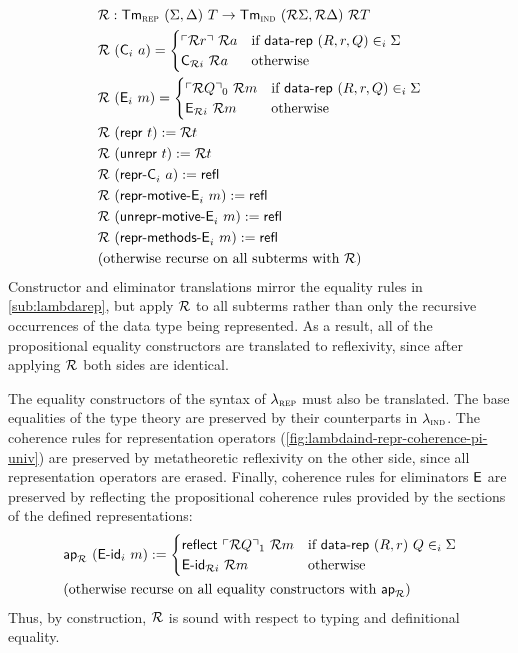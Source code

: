 \begin{align*}
  & \mathcal{R} : \textsf{Tm}_{\textsc{rep}}\ (\Sigma, \Delta)\ T \to \textsf{Tm}_{\textsc{ind}}\ (\mathcal{R} \Sigma, \mathcal{R} \Delta)\ \mathcal{R} T \\
  &\mathcal{R}\ (\textsf{C}_i\ a) = \begin{cases}
      \ulcorner \mathcal{R} r \urcorner\ \mathcal{R} a & \text{if}\ \textsf{data-rep}\ (R, r, Q) \in_i \Sigma \\
      \textsf{C}_{\mathcal{R} i}\ \mathcal{R} a & \text{otherwise}
  \end{cases} \\
  &\mathcal{R}\ (\textsf{E}_i\ m) = \begin{cases}
      \ulcorner \mathcal{R} Q \urcorner_0\ \mathcal{R} m & \text{if}\ \textsf{data-rep}\ (R, r, Q) \in_i \Sigma \\
      \textsf{E}_{\mathcal{R} i}\ \mathcal{R} m & \text{otherwise}
  \end{cases} \\
  & \mathcal{R}\ (\textsf{repr}\ t) := \mathcal{R} t \\
  & \mathcal{R}\ (\textsf{unrepr}\ t) := \mathcal{R} t \\
  & \mathcal{R}\ (\textsf{repr-C}_i\ a) := \textsf{refl} \\
  & \mathcal{R}\ (\textsf{repr-motive-E}_i\ m) := \textsf{refl} \\
  & \mathcal{R}\ (\textsf{unrepr-motive-E}_i\ m) := \textsf{refl} \\
  & \mathcal{R}\ (\textsf{repr-methods-E}_i\ m) := \textsf{refl} \\
  & \text{(otherwise recurse on all subterms with $\mathcal{R}$)}
\end{align*}
Constructor and eliminator translations mirror the equality rules in
\cref{sub:lambdarep}, but apply $\mathcal{R}$ to all subterms rather than only the
recursive occurrences of the data type being represented. As a result, all of
the propositional equality constructors are translated to reflexivity, since
after applying $\mathcal{R}$ both sides are identical.

The equality constructors of the syntax of $\lambda_{\textsc{rep}}$ must also be translated.
The base equalities of the type theory are preserved by their counterparts in $\lambda_{\textsc{ind}}$.
The coherence rules for representation operators
(\cref{fig:lambdaind-repr-coherence-pi-univ}) are preserved by metatheoretic
reflexivity on the other side, since all representation operators are erased.
Finally, coherence rules for eliminators $\textsf{E}$ are preserved by reflecting
the propositional coherence rules provided by the sections of the defined
representations:
\begin{align*}
& \mta{ap}_\R\ (\mta{E-id}_i\ m) :=
\begin{cases}
    \mta{reflect}\ \emb{\R Q}_1\ \R m & \text{if}\ \mta{data-rep}\ (R, r)\ Q \in_i \Sigma \\
    \mta{E-id}_{\R i}\ \R m & \text{otherwise}
    \end{cases} \\
& \text{(otherwise recurse on all equality constructors with $\mta{ap}_\R$)}
\end{align*}
Thus, by construction, $\mathcal{R}$ is sound with respect to typing and definitional equality.

